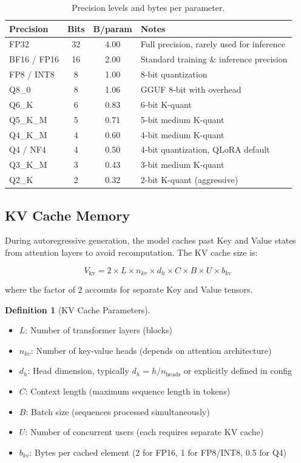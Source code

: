 \documentclass[11pt,a4paper]{article}
\theoremstyle{definition}
\newtheorem{definition}{Definition}[section]
\begin{document}
\begin{table}[htbp]
\centering
\caption{Precision levels and bytes per parameter.}\label{tab:precision}
\begin{tabularx}{0.85\textwidth}{lccX}
\toprule
\textbf{Precision} & \textbf{Bits} & \textbf{B/param} & \textbf{Notes} \\
\midrule
FP32 & 32 & 4.00 & Full precision, rarely used for inference \\
BF16 / FP16 & 16 & 2.00 & Standard training \& inference precision \\
FP8 / INT8 & 8 & 1.00 & 8-bit quantization \\
Q8\_0 & 8 & 1.06 & GGUF 8-bit with overhead \\
Q6\_K & 6 & 0.83 & 6-bit K-quant \\
Q5\_K\_M & 5 & 0.71 & 5-bit medium K-quant \\
Q4\_K\_M & 4 & 0.60 & 4-bit medium K-quant \\
Q4 / NF4 & 4 & 0.50 & 4-bit quantization, QLoRA default \\
Q3\_K\_M & 3 & 0.43 & 3-bit medium K-quant \\
Q2\_K & 2 & 0.32 & 2-bit K-quant (aggressive) \\
\bottomrule
\end{tabularx}
\end{table}

\subsection{KV Cache Memory}

During autoregressive generation, the model caches past Key and Value states from attention layers to avoid recomputation. The KV cache size is:

\begin{equation}\label{eq:kvcache}
V_{\text{kv}} = 2 \times L \times n_{kv} \times d_h \times C \times B \times U \times b_{kv}
\end{equation}

where the factor of 2 accounts for separate Key and Value tensors.

\begin{definition}[KV Cache Parameters]
\begin{itemize}
  \item $L$: Number of transformer layers (blocks)
  \item $n_{kv}$: Number of key-value heads (depends on attention architecture)
  \item $d_h$: Head dimension, typically $d_h = h / n_{\text{heads}}$ or explicitly defined in config
  \item $C$: Context length (maximum sequence length in tokens)
  \item $B$: Batch size (sequences processed simultaneously)
  \item $U$: Number of concurrent users (each requires separate KV cache)
  \item $b_{kv}$: Bytes per cached element (2 for FP16, 1 for FP8/INT8, 0.5 for Q4)
\end{itemize}
\end{definition}
\end{document}
